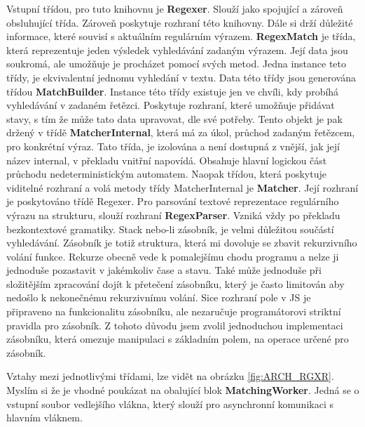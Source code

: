Vstupní třídou, pro tuto knihovnu je \textbf{Regexer}. 
Slouží jako spojující a zároveň obsluhující třída. 
Zároveň poskytuje rozhraní této knihovny.
Dále si drží důležité informace, které souvisí s aktuálním regulárním výrazem.
\textbf{RegexMatch} je třída, která reprezentuje jeden výsledek vyhledávání zadaným výrazem.
Její data jsou soukromá, ale umožňuje je procházet pomocí svých metod.
Jedna instance teto třídy, je ekvivalentní jednomu vyhledání v textu.
Data této třídy jsou generována třídou \textbf{MatchBuilder}.
Instance této třídy existuje jen ve chvíli, kdy probíhá vyhledávání v zadaném řetězci.
Poskytuje rozhraní, které umožňuje přidávat stavy, s tím že může tato data upravovat, dle své potřeby.
Tento objekt je pak držený v třídě \textbf{MatcherInternal}, 
která má za úkol, průchod zadaným řetězcem, pro konkrétní výraz.
Tato třída, je izolována a není dostupná z vnější, jak její název internal, v překladu vnitřní napovídá.
Obsahuje hlavní logickou část průchodu nedeterministickým automatem.
Naopak třídou, která poskytuje viditelné rozhraní a volá metody třídy MatcherInternal je \textbf{Matcher}.
Její rozhraní je poskytováno třídě Regexer.
Pro parsování textové reprezentace regulárního výrazu na strukturu, slouží rozhraní \textbf{RegexParser}.
Vzniká vždy po překladu bezkontextové gramatiky.
Stack nebo-li zásobník, je velmi důležitou součástí vyhledávání.
Zásobník je totiž struktura, která mi dovoluje se zbavit rekurzivního volání funkce.
Rekurze obecně vede k pomalejšímu chodu programu a nelze ji jednoduše pozastavit v jakémkoliv čase a stavu.
Také může jednoduše při složitějším zpracování dojít k přetečení zásobníku, který je často limitován aby nedošlo k nekonečnému rekurzivnímu volání.
Sice rozhraní pole v JS je připraveno na funkcionalitu zásobníku, ale nezaručuje programátorovi striktní pravidla pro zásobník. 
Z tohoto důvodu jsem zvolil jednoduchou implementaci zásobníku, která omezuje manipulaci s základním polem, na operace určené pro zásobník.

Vztahy mezi jednotlivými třídami, lze vidět na obrázku \ref{fig:ARCH_RGXR}. 
Myslím si že je vhodné poukázat na obalující blok \textbf{MatchingWorker}.
Jedná se o vstupní soubor vedlejšího vlákna, který slouží pro asynchronní komunikaci s hlavním vláknem.



